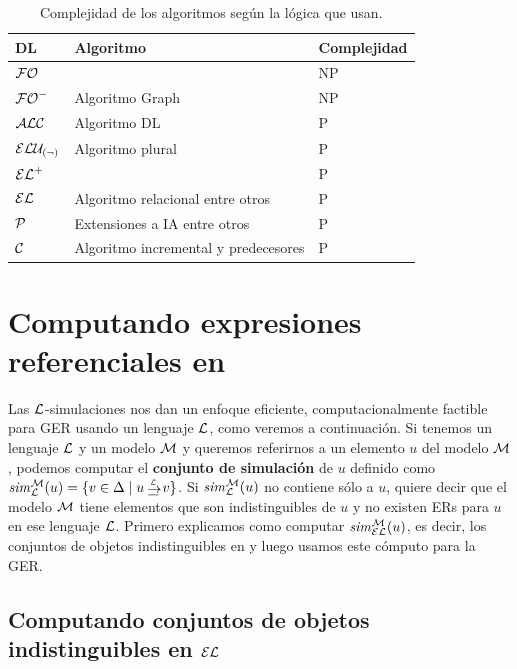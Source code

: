 \begin{table}[t]
\begin{center}
\begin{tabular}{|l|l|l|}

\hline
  DL & Algoritmo  & Complejidad \\  \hline
  $\mathcal{FO}$   &  																		 & NP\\ \hline
  ${\mathcal{FO}^-}$ & Algoritmo Graph \cite{graph}   & NP\\ \hline 
  $\mathcal{ALC}$   & Algoritmo DL \cite{areces08} & P\\ \hline
 	$\mathcal{ELU_{(\neg)} }$ & Algoritmo plural \cite{gardent02:_gener_minim_defin_descr} &P\\ \hline
  ${\mathcal{EL}^+}$ & &P\\ \hline
	$\mathcal{EL}$   & Algoritmo relacional \cite{Horacek1997} entre otros&P\\ \hline
	$\mathcal{P}$ &  Extensiones a IA \cite{deemter02:CL} entre otros&P\\ \hline
	$\mathcal{C}$ & Algoritmo incremental y predecesores \cite{incremental} &P\\ 
	
\hline	
\end{tabular}
\caption{Complejidad de los algoritmos seg\'un la l\'ogica que usan.}\label{tab:algoritmos-complejidad}
\end{center}
\end{table}


\section{Computando expresiones referenciales en \EL}\label{sec:simulation}
\label{sec:greViaSimulacion}

Las $\mathcal{L}$-simulaciones nos dan un enfoque eficiente, computacionalmente factible para GER usando un lenguaje $\mathcal{L}$, como veremos a continuaci\'on. Si tenemos un lenguaje $\mathcal{L}$ y un modelo $\mathcal{M}$ y queremos referirnos a un elemento $u$ del modelo $\mathcal{M}$, podemos computar el {\bf conjunto de simulaci\'on} de $u$ definido como
$\simset_{\+L}^{\+M}(u) = \cset{v \in \Delta \mid u \simul{\+L} v}$. Si ${\it sim}_{\mathcal{L}}^{\mathcal{M}}(u)$ no contiene s\'olo a $u$, quiere decir que el modelo $\mathcal{M}$ tiene elementos que son indistinguibles de $u$ y no existen ERs para $u$ en ese lenguaje $\mathcal{L}$.
Primero explicamos como computar ${\it sim}_{\mathcal{EL}}^{\mathcal{M}}(u)$, es decir, los conjuntos de objetos indistinguibles en \EL y luego usamos este c\'omputo para la GER.

\subsection{Computando conjuntos de objetos indistinguibles en $\mathcal{EL}$}
\label{sec:indistinguiblesEL}

